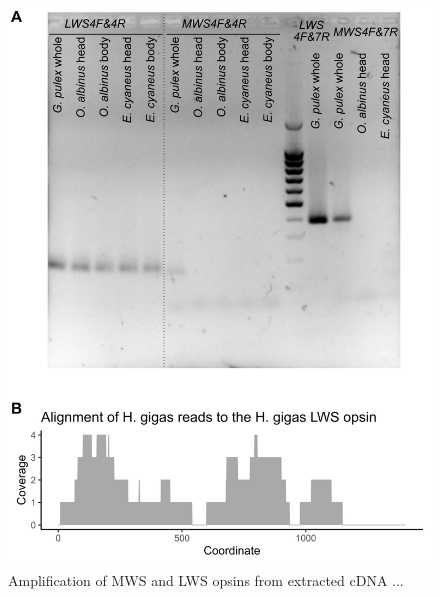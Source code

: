 \documentclass{article}
\begin{document}
\begin{figure}[H] 
	\includegraphics[scale=0.65]{./FigS4_cDNA_diff_body_parts.png}
	\caption{Amplification of MWS and LWS opsins from extracted cDNA ...} \end{figure}
	

	
\end{document}
